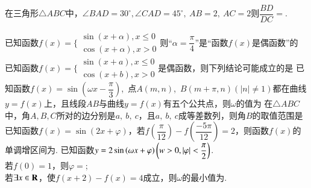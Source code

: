 \documentclass{BHCexam}
\begin{document}
\begin{questions}
\qs 在三角形$\triangle ABC$中，$ \angle BAD=30^{\circ},\angle CAD=45^{\circ},~AB=2,~AC=2 $则$ \dfrac{BD}{DC}= $\tk.
\vspace{-2em}
\begin{center}
\end{center} 
\qs 已知函数$f(x)=\Bigg\{\begin{aligned}
\sin(x+\alpha),x\le 0\\\cos (x+\alpha),x>0
\end{aligned}$则“$ \alpha=\dfrac{\pi}{4} $”是“函数$f(x)$是偶函数”的\xx
{}
\qs 已知函数$f(x)=\Bigg\{\begin{aligned}
\sin(x+a),x\le 0\\\cos (x+b),x>0
\end{aligned}$是偶函数，则下列结论可能成立的是\xx
{}
\qs 已知函数$f(x)=\sin (\omega x-\dfrac{\pi}{3})$,~点$ A(m,n) $,~$ B(m+\pi,n) (\left|n\right|\ne 1)$都在曲线$ y=f(x) $上，且线段$ AB $与曲线$ y=f(x) $有五个公共点，则$ \omega $的值为\xx
{}
\qs 在$\triangle ABC$中，角$ A,B,C $所对的边分别是$ a,\ b,\ c $，且$ a,\ b,\ c $成等差数列，则角$ B $的取值范围是\xx
\onech{$ \left(0,\dfrac{\pi}{3}\right]$}{$ \left(\dfrac{\pi}{6},\dfrac{\pi}{2}\right)$}{$ \left(\dfrac{\pi}{4},\dfrac{\pi}{2}\right)$}{$ \left(\dfrac{\pi}{3},\dfrac{\pi}{2}\right)$}
\qs 已知函数$f(x)=\sin (2x+\varphi)$，若$ f(\dfrac{\pi}{12})-f(\dfrac{-5\pi}{12})=2 $，则函数$f(x)$的单调增区间为\tk.
\qs 已知函数$ y=2\sin\left(\omega x+\varphi\right) \left(w>0,\left| \varphi \right|<\dfrac{\pi}{2}\right)$.\\
若$f(0)=1$，则$ \varphi= $\tk;\\
若$ \exists x\in\mathbf{R} $，使$ f(x+2)-f(x)=4 $成立，则$ \omega  $的最小值为\tk.






\end{questions}
\end{document}
